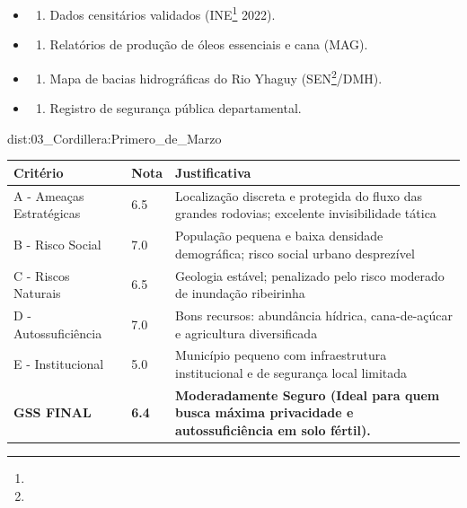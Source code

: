 {\begin{itemize}
\tightlist
\item
  \begin{enumerate}
  \def\labelenumi{\arabic{enumi})}
  \tightlist
  \item
    Dados censitários validados (INE\footnote{\fineINE} 2022).
  \end{enumerate}
\item
  \begin{enumerate}
  \def\labelenumi{\arabic{enumi})}
  \setcounter{enumi}{1}
  \tightlist
  \item
    Relatórios de produção de óleos essenciais e cana (MAG).
  \end{enumerate}
\item
  \begin{enumerate}
  \def\labelenumi{\arabic{enumi})}
  \setcounter{enumi}{2}
  \tightlist
  \item
    Mapa de bacias hidrográficas do Rio Yhaguy (SEN\footnote{\fineSEN}/\allowbreak DMH).
  \end{enumerate}
\item
  \begin{enumerate}
  \def\labelenumi{\arabic{enumi})}
  \setcounter{enumi}{3}
  \tightlist
  \item
    Registro de segurança pública departamental.
  \end{enumerate}
\end{itemize}}{dist:03_Cordillera:Primero_de_Marzo}
\begin{table}[ht!]
\small \begin{tabular}{p{3.0cm}p{0.8cm}p{6.0cm}} \toprule
\textbf{Critério} & \textbf{Nota} & \textbf{Justificativa} \\ \midrule
A - Ameaças Estratégicas & 6.5 & Localização discreta e protegida do fluxo das grandes rodovias; excelente invisibilidade tática \\
B - Risco Social & 7.0 & População pequena e baixa densidade demográfica; risco social urbano desprezível \\
C - Riscos Naturais & 6.5 & Geologia estável; penalizado pelo risco moderado de inundação ribeirinha \\
D - Autossuficiência & 7.0 & Bons recursos: abundância hídrica, cana-de-açúcar e agricultura diversificada \\
E - Institucional & 5.0 & Município pequeno com infraestrutura institucional e de segurança local limitada \\
\midrule \textbf{GSS FINAL} & \textbf{6.4} & \textbf{Moderadamente Seguro (Ideal para quem busca máxima privacidade e autossuficiência em solo fértil).} \\ \bottomrule \end{tabular}
\end{table}
